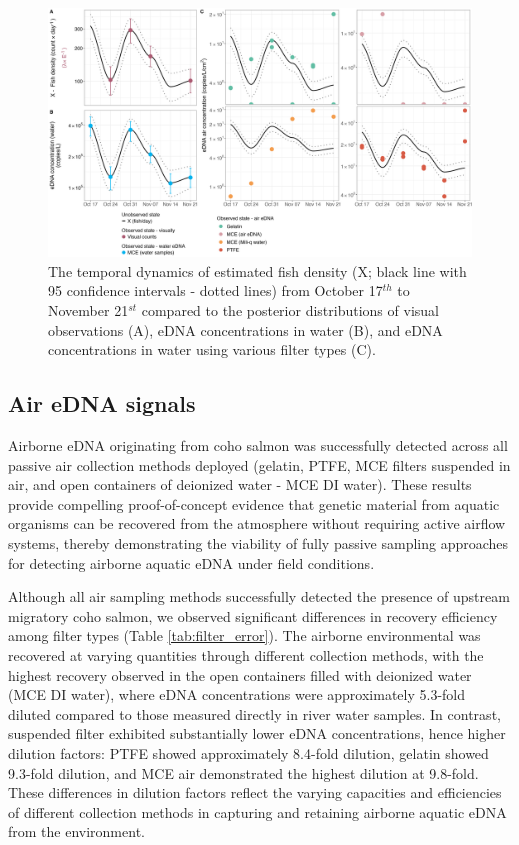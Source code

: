 \documentclass{article}
\begin{document}
\begin{figure}[tbhp] 
\centering
\includegraphics[width=16.5cm]{Plots/Figure_1.jpg}  
\caption{The temporal dynamics of estimated fish density (X; black line with 95 confidence intervals - dotted lines) from October 17$^{th}$ to November 21$^{st}$ compared to the posterior distributions of visual observations (A), eDNA concentrations in water (B), and eDNA concentrations in water using various filter types (C).}
\label{fig:fig1}
\end{figure}


\subsection{Air eDNA signals}
Airborne eDNA originating from coho salmon was successfully detected across all passive air collection methods deployed (gelatin, PTFE, MCE filters suspended in air, and open containers of deionized water - MCE DI water). These results provide compelling proof-of-concept evidence that genetic material from aquatic organisms can be recovered from the atmosphere without requiring active airflow systems, thereby demonstrating the viability of fully passive sampling approaches for detecting airborne aquatic eDNA under field conditions.

Although all air sampling methods successfully detected the presence of upstream migratory coho salmon, we observed significant differences in recovery efficiency among filter types (Table \ref{tab:filter_error}). The airborne environmental was recovered at varying quantities through different collection methods, with the highest recovery observed in the open containers filled with deionized water (MCE DI water), where eDNA concentrations were approximately 5.3-fold diluted compared to those measured directly in river water samples.
In contrast, suspended filter exhibited substantially lower eDNA concentrations, hence higher dilution factors: PTFE showed approximately 8.4-fold dilution, gelatin showed 9.3-fold dilution, and MCE air demonstrated the highest dilution at 9.8-fold. These differences in dilution factors reflect the varying capacities and efficiencies of different collection methods in capturing and retaining airborne aquatic eDNA from the environment.
\end{document}
